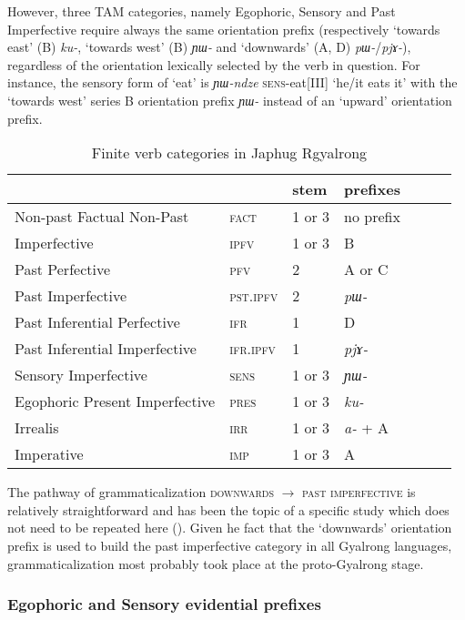 \documentclass[oneside,a4paper,11pt]{article}
\newcommand{\ipa}[1]{\mbox{\phon\textit{#1}}} %
\begin{document}
However, three TAM categories, namely Egophoric, Sensory and Past Imperfective require always the same orientation prefix (respectively `towards east' (B) \ipa{ku-}, `towards west' (B) \ipa{ɲɯ-} and `downwards' (A, D) \ipa{pɯ-}/\ipa{pjɤ-}), regardless of the orientation lexically selected by the verb in question. For instance, the sensory form of `eat' is \ipa{ɲɯ-ndze} \textsc{sens}-eat[III] `he/it eats it' with the `towards west' series B orientation prefix \ipa{ɲɯ-} instead of an `upward' orientation prefix.

\begin{table}[H]
\caption{Finite verb categories in Japhug Rgyalrong} \label{tab:finite.forms} \centering
\begin{tabular}{lllllll}
\toprule
&	&	stem&	prefixes\\
\midrule
Non-past Factual Non-Past&	\textsc{fact} &	1 or 3&	no prefix\\
Imperfective&	\textsc{ipfv} &	1 or 3&	B\\
Past Perfective &	\textsc{pfv} &	2&	A or C\\
Past Imperfective &	\textsc{pst.ipfv} &	2&	\ipa{pɯ-}\\
Past Inferential Perfective &	\textsc{ifr} &	1&	D\\
Past Inferential Imperfective&	\textsc{ifr.ipfv} &	1&	\ipa{pjɤ-}\\
Sensory Imperfective&	\textsc{sens} &	1 or 3&	\ipa{ɲɯ-}\\
Egophoric Present Imperfective&	\textsc{pres} &	1 or 3&	\ipa{ku-}\\
Irrealis&	\textsc{irr} &	1 or 3&	\ipa{a-} + A\\
Imperative&	\textsc{imp} &	1 or 3&	A\\
\bottomrule
\end{tabular}
\end{table}

The pathway of grammaticalization \textsc{downwards} $\rightarrow $ \textsc{past imperfective} is relatively straightforward and has been the topic of a specific study which does not need to be repeated here (\citealt{lin11direction}). Given he fact that the `downwards' orientation prefix is used to build the past imperfective category in all Gyalrong languages, grammaticalization most probably took place at the proto-Gyalrong stage.

\subsubsection{Egophoric and Sensory evidential prefixes} \label{sec:egoph}
\end{document}
